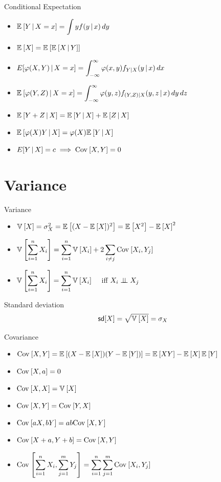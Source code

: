 \documentclass[landscape]{article}
\begin{document}
\begin{multicols*}{2}
Conditional Expectation
\begin{itemize}
  \item $\E{Y\giv X=x} = \displaystyle\int y f(y\giv x)\dy$
  \item $\E{X} = \E{\E{X\giv Y}}$
  \item $E[\transform(X,Y)\giv X=x] 
    = \displaystyle\int_{-\infty}^\infty \transform(x,y)f_{Y|X}(y\giv x)\dx$
  \item $\E{\transform(Y,Z)\giv X=x} = 
    \displaystyle\int_{-\infty}^\infty\transform(y,z) 
    f_{(Y,Z)|X}(y,z\giv x)\,dy\,dz$
  \item $\E{Y+Z\giv X} = \E{Y\giv X} + \E{Z\giv X}$
  \item $\E{\transform(X)Y\giv X} = \transform(X)\E{Y\giv X}$
  \item $E[Y\giv X] = c \imp \cov{X,Y}=0$
\end{itemize}

\section{Variance}

Variance
\begin{itemize}
  \item $\V{X} = \sigma_X^2 = \E{(X-\E{X})^2} = \E{X^2} - \E{X}^2$
  \item $\V{\displaystyle\sum_{i=1}^n X_i} = 
    \displaystyle\sum_{i=1}^n \V{X_i} + 
    2\sum_{i\ne j}\cov{X_i,Y_j}$
  \item $\V{\displaystyle\sum_{i=1}^n X_i} = 
    \displaystyle\sum_{i=1}^n\V{X_i} \quad$ iff $X_i \ind X_j$
\end{itemize}

Standard deviation
$$\sd[X] = \sqrt{\V{X}} = \sigma_X$$

Covariance
\begin{itemize}
  \item $\cov{X,Y} = \E{(X-\E{X})(Y-\E{Y})} = \E{XY}-\E{X}\E{Y}$
  \item $\cov{X,a} = 0$
  \item $\cov{X,X} = \V{X}$
  \item $\cov{X,Y} = \cov{Y,X}$
  \item $\cov{aX,bY} = ab\cov{X,Y}$
  \item $\cov{X+a,Y+b} = \cov{X,Y}$
  \item $\cov{\displaystyle\sumin X_i, \sumjm Y_j} 
    = \displaystyle\sumin\sumjm\cov{X_i, Y_j}$
\end{itemize}


\end{multicols*}
\end{document}
